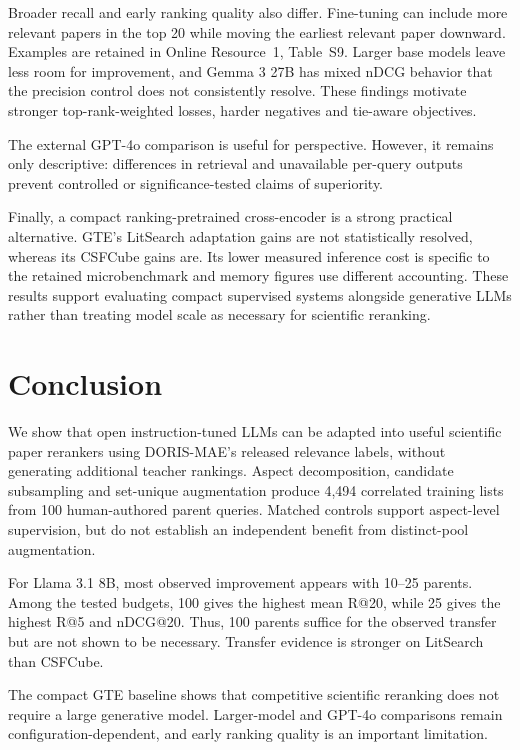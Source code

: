 \documentclass[pdflatex,sn-basic,Numbered]{sn-jnl}%
\theoremstyle{thmstyleone}%
\theoremstyle{thmstyletwo}%
\theoremstyle{thmstylethree}%
\begin{document}
Broader recall and early ranking quality also differ. Fine-tuning can include
more relevant papers in the top 20 while moving the earliest relevant paper
downward. Examples are retained in Online Resource~1, Table~S9. Larger
base models leave less room for improvement, and Gemma 3 27B has mixed nDCG
behavior that the precision control does not consistently resolve.
These findings motivate stronger top-rank-weighted
losses, harder negatives and tie-aware objectives.

The external GPT-4o comparison is useful for perspective. However, it remains only descriptive: differences in retrieval
and unavailable per-query outputs prevent controlled or significance-tested
claims of superiority.

Finally, a compact ranking-pretrained cross-encoder is a strong practical
alternative. GTE's LitSearch adaptation gains are not statistically resolved,
whereas its CSFCube gains are. Its lower measured inference cost is specific to
the retained microbenchmark and memory figures use different accounting.
These results support evaluating compact supervised systems alongside generative
LLMs rather than treating model scale as necessary for scientific reranking.

\section{Conclusion}
We show that open instruction-tuned LLMs can be adapted into useful scientific
paper rerankers using DORIS-MAE's released relevance labels, without generating
additional teacher rankings. Aspect decomposition, candidate subsampling and
set-unique augmentation produce 4,494 correlated training lists from 100
human-authored parent queries. Matched controls support aspect-level supervision,
but do not establish an independent benefit from distinct-pool augmentation.

For Llama 3.1 8B, most observed improvement appears with 10--25 parents.
Among the tested
budgets, 100 gives the highest mean R@20, while 25 gives the highest R@5 and
nDCG@20. Thus, 100 parents suffice for the observed transfer but are not shown
to be necessary. Transfer evidence is stronger on LitSearch than CSFCube.

The compact GTE baseline shows that competitive scientific reranking does not
require a large generative model. 
Larger-model and GPT-4o comparisons remain
configuration-dependent, and early ranking quality is an important limitation.
\end{document}

